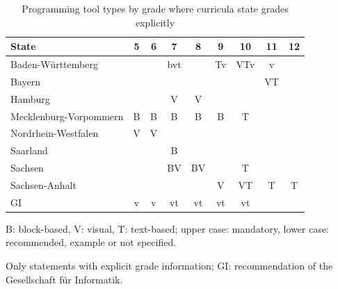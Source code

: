 \begin{table}
\centering
\small
\begin{threeparttable}
\caption{Programming tool types by grade where curricula state grades explicitly}\label{tab:curricula-grades-explicit}
\begin{tabular}{lcccccccc}
\toprule
State & 5 & 6 & 7 & 8 & 9 & 10 & 11 & 12 \\
\midrule
Baden-Württemberg &  &  & bvt &  & Tv & VTv & v &  \\
Bayern &  &  &  &  &  &  & VT &  \\
Hamburg &  &  & V & V &  &  &  &  \\
Mecklenburg-Vorpommern & B & B & B & B & B & T &  &  \\
Nordrhein-Westfalen & V & V &  &  &  &  &  &  \\
Saarland &  &  & B &  &  &  &  &  \\
Sachsen &  &  & BV & BV &  & T &  &  \\
Sachsen-Anhalt &  &  &  &  & V & VT & T & T \\
GI & v & v & vt & vt & vt & vt &  &  \\
\bottomrule
\end{tabular}

\begin{tablenotes}\smaller
\item B: block-based, V: visual, T: text-based; upper case: mandatory, lower case: recommended, example or not specified.
\item Only statements with explicit grade information; GI: recommendation of the Gesellschaft für Informatik.
\end{tablenotes}
\end{threeparttable}
\end{table}
